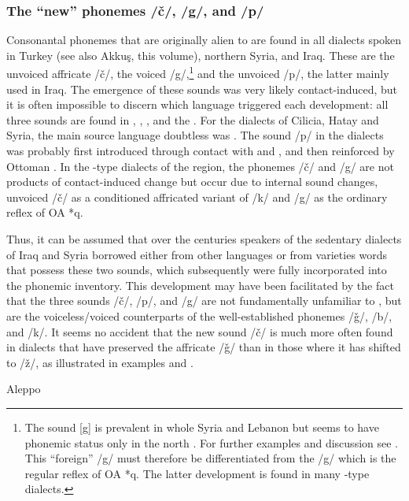 \documentclass[output=paper]{langsci/langscibook}
\begin{document}
  \subsubsection{The “new” phonemes /č/, /g/, and /p/} 

Consonantal phonemes that are originally alien to  are found in all  dialects spoken in Turkey (see also Akkuş, this volume), northern Syria, and Iraq. These are the unvoiced affricate /č/, the voiced /g/,\footnote{The sound [g] is prevalent in whole Syria and Lebanon but seems to have phonemic status only in the north \citep[26]{Sabuni1980}. For further examples and discussion see \citet{Ferguson1969}. This “foreign” /g/ must therefore be differentiated from the /g/ which is the regular reflex of OA *q. The latter development is found in many -type dialects.} and the unvoiced /p/, the latter mainly used in Iraq. The emergence of these sounds was very likely contact-induced, but it is often impossible to discern which language triggered each development: all three sounds are found in , , , and the . For the dialects of Cilicia, Hatay and Syria, the main {source language} doubtless was . The sound /p/ in the  dialects was probably first introduced through contact with  and , and then reinforced by Ottoman . In the -type dialects of the region, the phonemes /č/ and /g/ are not products of contact-induced change but occur due to internal sound changes, unvoiced /č/ as a conditioned affricated variant of /k/ and /g/ as the ordinary reflex of OA *q. 

Thus, it can be assumed that over the centuries speakers of the sedentary dialects of Iraq and Syria borrowed either from other languages or from   varieties words that possess these two sounds, which subsequently were fully incorporated into the phonemic inventory. This development may have been facilitated by the fact that the three sounds /č/, /p/, and /g/ are not fundamentally unfamiliar to , but are the voiceless/voiced counterparts of the well-established phonemes /ǧ/, /b/, and /k/. It seems no accident that the new sound /č/ is much more often found in dialects that have preserved the affricate /ǧ/ than in those where it has shifted to /ž/, as illustrated in examples  and .

\ea\label{Aleppo}
Aleppo \citep[205--210]{Sabuni1980}
\end{document}

